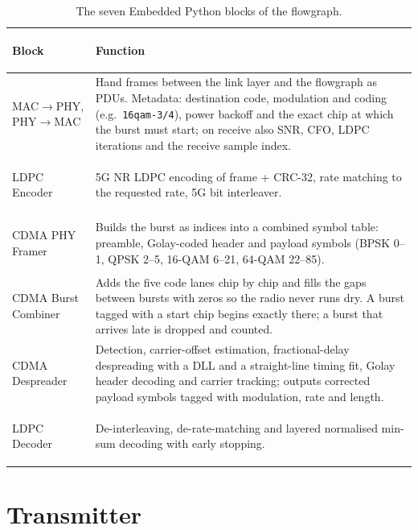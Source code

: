 \documentclass[11pt,a4paper,oneside]{report}
\newcommand{\code}[1]{\texttt{\small #1}}
\begin{document}
\begin{table}[htbp]
\centering\small
\caption{The seven Embedded Python blocks of the flowgraph.}\label{tab:epy}
\begin{tabularx}{\linewidth}{@{}>{\bfseries\raggedright\arraybackslash}p{30mm}L@{}}
\toprule
Block & Function\\
\midrule
MAC$\to$PHY, PHY$\to$MAC & Hand frames between the link layer and the flowgraph as PDUs. Metadata: destination code, modulation and coding (e.g.\ \code{16qam-3/4}), power backoff and the exact chip at which the burst must start; on receive also SNR, CFO, LDPC iterations and the receive sample index.\\
LDPC Encoder & 5G NR LDPC encoding of frame + CRC-32, rate matching to the requested rate, 5G bit interleaver.\\
CDMA PHY Framer & Builds the burst as indices into a combined symbol table: preamble, Golay-coded header and payload symbols (BPSK 0--1, QPSK 2--5, 16-QAM 6--21, 64-QAM 22--85).\\
CDMA Burst Combiner & Adds the five code lanes chip by chip and fills the gaps between bursts with zeros so the radio never runs dry. A burst tagged with a start chip begins exactly there; a burst that arrives late is dropped and counted.\\
CDMA Despreader & Detection, carrier-offset estimation, fractional-delay despreading with a DLL and a straight-line timing fit, Golay header decoding and carrier tracking; outputs corrected payload symbols tagged with modulation, rate and length.\\
LDPC Decoder & De-interleaving, de-rate-matching and layered normalised min-sum decoding with early stopping.\\
\bottomrule
\end{tabularx}
\end{table}

\section{Transmitter}\label{sec:tx}
\end{document}

